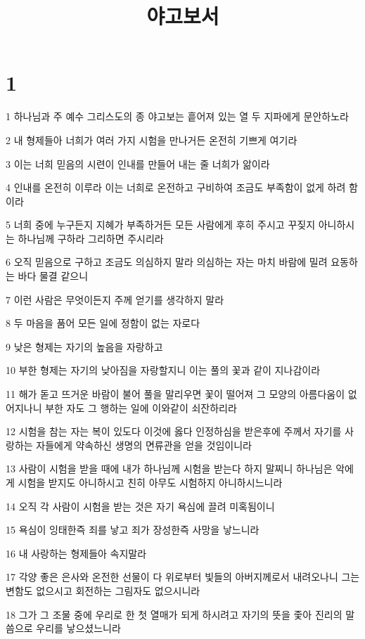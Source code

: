 

\title{야고보서}


\chapter{1}

\par 1 하나님과 주 예수 그리스도의 종 야고보는 흩어져 있는 열 두 지파에게 문안하노라
\par 2 내 형제들아 너희가 여러 가지 시험을 만나거든 온전히 기쁘게 여기라
\par 3 이는 너희 믿음의 시련이 인내를 만들어 내는 줄 너희가 앎이라
\par 4 인내를 온전히 이루라 이는 너희로 온전하고 구비하여 조금도 부족함이 없게 하려 함이라
\par 5 너희 중에 누구든지 지혜가 부족하거든 모든 사람에게 후히 주시고 꾸짖지 아니하시는 하나님께 구하라 그리하면 주시리라
\par 6 오직 믿음으로 구하고 조금도 의심하지 말라 의심하는 자는 마치 바람에 밀려 요동하는 바다 물결 같으니
\par 7 이런 사람은 무엇이든지 주께 얻기를 생각하지 말라
\par 8 두 마음을 품어 모든 일에 정함이 없는 자로다
\par 9 낮은 형제는 자기의 높음을 자랑하고
\par 10 부한 형제는 자기의 낮아짐을 자랑할지니 이는 풀의 꽃과 같이 지나감이라
\par 11 해가 돋고 뜨거운 바람이 불어 풀을 말리우면 꽃이 떨어져 그 모양의 아름다움이 없어지나니 부한 자도 그 행하는 일에 이와같이 쇠잔하리라
\par 12 시험을 참는 자는 복이 있도다 이것에 옳다 인정하심을 받은후에 주께서 자기를 사랑하는 자들에게 약속하신 생명의 면류관을 얻을 것임이니라
\par 13 사람이 시험을 받을 때에 내가 하나님께 시험을 받는다 하지 말찌니 하나님은 악에게 시험을 받지도 아니하시고 친히 아무도 시험하지 아니하시느니라
\par 14 오직 각 사람이 시험을 받는 것은 자기 욕심에 끌려 미혹됨이니
\par 15 욕심이 잉태한즉 죄를 낳고 죄가 장성한즉 사망을 낳느니라
\par 16 내 사랑하는 형제들아 속지말라
\par 17 각양 좋은 은사와 온전한 선물이 다 위로부터 빛들의 아버지께로서 내려오나니 그는 변함도 없으시고 회전하는 그림자도 없으시니라
\par 18 그가 그 조물 중에 우리로 한 첫 열매가 되게 하시려고 자기의 뜻을 좇아 진리의 말씀으로 우리를 낳으셨느니라
